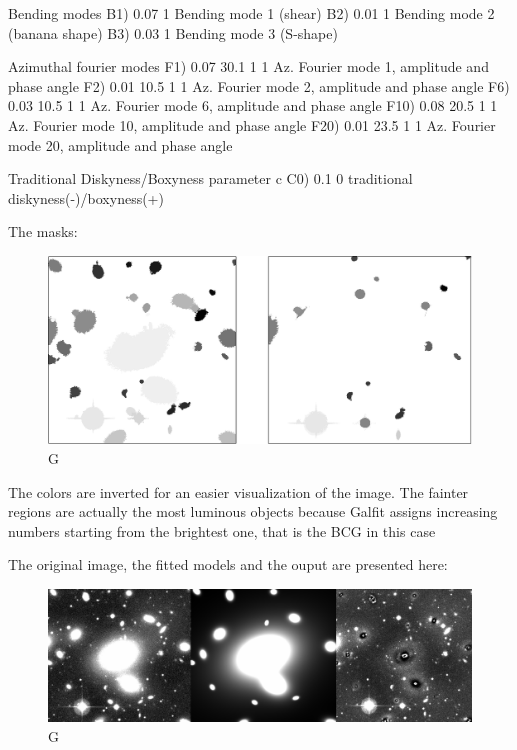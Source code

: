   Bending modes
B1)  0.07      1        Bending mode 1 (shear)
B2)  0.01      1        Bending mode 2 (banana shape)
B3)  0.03      1        Bending mode 3 (S-shape)

  Azimuthal fourier modes
F1)  0.07  30.1  1  1   Az. Fourier mode 1, amplitude and phase angle
F2)  0.01  10.5  1  1   Az. Fourier mode 2, amplitude and phase angle
F6)  0.03  10.5  1  1  Az. Fourier mode 6, amplitude and phase angle
F10)  0.08  20.5  1  1   Az. Fourier mode 10, amplitude and phase angle
F20)  0.01  23.5  1  1   Az. Fourier mode 20, amplitude and phase angle

  Traditional Diskyness/Boxyness parameter c
C0) 0.1         0       traditional diskyness(-)/boxyness(+)

The masks:

\begin{figure}[H]
\centering
\includegraphics[width=12cm]{images/masks.png}
\caption[M]{G}
\end{figure}

The colors are inverted for an easier visualization of the image. The fainter regions are actually the most luminous objects because Galfit assigns increasing numbers starting from the brightest one, that is the BCG in this case

The original image, the fitted models and the ouput are presented here:

\begin{figure}[H]
\centering
\includegraphics[width=15cm]{images/galfit.png}
\caption[M]{G}
\end{figure}

